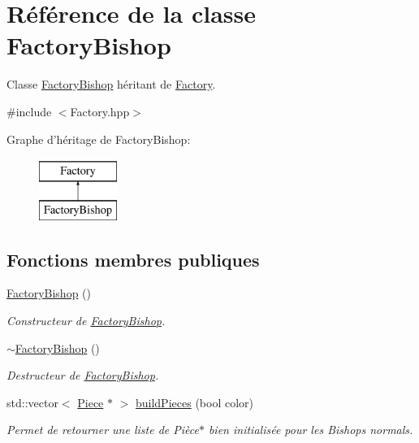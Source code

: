 \hypertarget{class_factory_bishop}{\section{Référence de la classe Factory\-Bishop}
\label{class_factory_bishop}
}


Classe \hyperlink{class_factory_bishop}{Factory\-Bishop} héritant de \hyperlink{class_factory}{Factory}.  




{\ttfamily \#include $<$Factory.\-hpp$>$}

Graphe d'héritage de Factory\-Bishop\-:\begin{figure}[H]
\begin{center}
\leavevmode
\includegraphics[height=2.000000cm]{class_factory_bishop}
\end{center}
\end{figure}
\subsection*{Fonctions membres publiques}
\begin{DoxyCompactItemize}
\item 
\hyperlink{class_factory_bishop_a6452991e628ec8262c57318da26171f1}{Factory\-Bishop} ()
\begin{DoxyCompactList}\small\item\em Constructeur de \hyperlink{class_factory_bishop}{Factory\-Bishop}. \end{DoxyCompactList}\item 
\hyperlink{class_factory_bishop_aacec6859e5c70571357c5d172a62a38e}{$\sim$\-Factory\-Bishop} ()
\begin{DoxyCompactList}\small\item\em Destructeur de \hyperlink{class_factory_bishop}{Factory\-Bishop}. \end{DoxyCompactList}\item 
std\-::vector$<$ \hyperlink{class_piece}{Piece} $\ast$ $>$ \hyperlink{class_factory_bishop_a501a01fc371b26931d528ea0aa8b5c14}{build\-Pieces} (bool color)
\begin{DoxyCompactList}\small\item\em Permet de retourner une liste de Pièce$\ast$ bien initialisée pour les Bishops normals. \end{DoxyCompactList}\end{DoxyCompactItemize}


